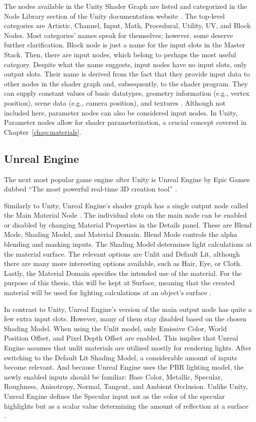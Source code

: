 \documentclass[
  digital,     %
  oneside,     %
  nosansbold,  %
  nocolorbold, %
  lof,         %
  lot,         %
]{fithesis4}
\begin{document}
The nodes available in the Unity Shader Graph are listed and categorized in the Node Library section
of the Unity documentation website \cite{unity-node-library}. The top-level categories are Artistic, Channel, Input,
Math, Procedural, Utility, UV, and Block Nodes. Most categories' names speak for themselves; however, some deserve
further clarification. Block node is just a name for the input slots in the Master Stack. Then, there are input nodes,
which belong to perhaps the most useful category. Despite what the name suggests,
input nodes have no input slots, only output slots. Their name is derived from the fact that
they provide input data to other nodes in the shader graph and, subsequently,
to the shader program. They can supply constant values of basic datatypes,
geometry information (e.g., vertex position), scene data (e.g., camera position), and textures \cite{unity-input-nodes}.
Although not included here, parameter nodes can also be considered input nodes.
In Unity, Parameter nodes allow for shader parameterization, a crucial concept covered in Chapter~\ref{chap:materials}.

\subsection{Unreal Engine}\label{sec:unreal-engine}
The next most popular game engine after Unity is Unreal Engine by Epic Games \cite{slashdata-game-engines} dubbed \enquote{The most
powerful real-time 3D creation tool} \cite{ue}.

Similarly to Unity, Unreal Engine's shader graph has a single output node called the Main Material Node \cite{ue-main-node}.
The individual slots on the main node can be enabled or disabled by changing Material Properties in the Details panel. These are
Blend Mode, Shading Model, and Material Domain. Blend Mode controls the alpha blending and masking inputs. The Shading Model
determines light calculations at the material surface. The relevant options are Unlit and Default Lit,
although there are many more interesting options available, such as Hair, Eye, or Cloth. Lastly, the Material Domain
specifies the intended use of the material. For the purpose of this thesis, this will be kept at Surface, meaning that
the created material will be used for lighting calculations at an object's surface \cite{ue-material-inputs}.

In contrast to Unity, Unreal Engine's version of the main output node has quite a few extra input slots. However, many of them
stay disabled based on the chosen Shading Model. When using the Unlit model, only Emissive Color, World Position Offset,
and Pixel Depth Offset are enabled. This implies that Unreal Engine assumes that unlit materials are utilized mostly for rendering lights.
After switching to the Default Lit Shading Model, a considerable amount of inputs become relevant. And because Unreal Engine uses the PBR
lighting model, the newly enabled inputs should be familiar: Base Color, Metallic, Specular, Roughness, Anisotropy,
Normal, Tangent, and Ambient Occlusion. Unlike Unity, Unreal Engine defines the Specular input not as the color of the
specular highlights but as a scalar value determining the amount of reflection at a surface \cite{ue-material-inputs}.
\end{document}
